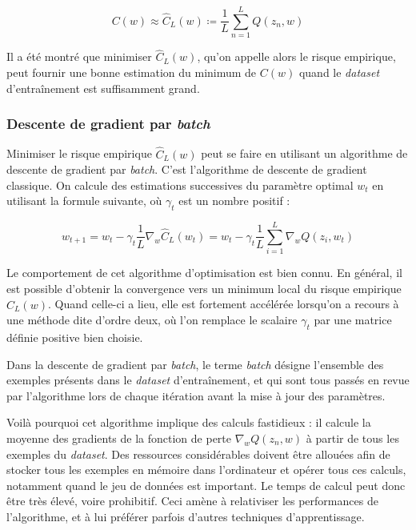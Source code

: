 \documentclass{article}
\begin{document}
\begin{equation*}
    C(w) \approx \hat{C}_L(w) \coloneqq \frac{1}{L} \sum_{n=1}^{L}Q(z_n, w)
\end{equation*}

Il a été montré que minimiser $\hat{C}_L(w)$, qu'on appelle alors le risque empirique, peut fournir une bonne estimation du minimum de $C(w)$ quand le \emph{dataset} d'entraînement est suffisamment grand.

\subsubsection{Descente de gradient par \emph{batch}}

Minimiser le risque empirique $\hat{C}_L(w)$ peut se faire en utilisant un algorithme de descente de gradient par \emph{batch}. C'est l'algorithme de descente de gradient classique. On calcule des estimations successives du paramètre optimal $w_t$ en utilisant la formule suivante, où $\gamma_t$ est un nombre positif :

\begin{equation*}
    w_{t+1} = w_t - \gamma_t \frac{1}{L} \nabla_w \hat{C}_L(w_t) = w_t - \gamma_t \frac{1}{L} \sum_{i=1}^{L} \nabla_w Q(z_i, w_t)
\end{equation*}

Le comportement de cet algorithme d'optimisation est bien connu. En général, il est possible d'obtenir la convergence vers un minimum local du risque empirique $\hat{C}_L(w)$. Quand celle-ci a lieu, elle est fortement accélérée lorsqu'on a recours à une méthode dite d'ordre deux, où l'on remplace le scalaire $\gamma_t$ par une matrice définie positive bien choisie.
\bigskip

Dans la descente de gradient par \emph{batch}, le terme \emph{batch} désigne l'ensemble des exemples présents dans le \emph{dataset} d'entraînement, et qui sont tous passés en revue par l'algorithme lors de chaque itération avant la mise à jour des paramètres. 

Voilà pourquoi cet algorithme implique des calculs fastidieux : il calcule la moyenne des gradients de la fonction de perte $\nabla_w Q(z_n, w)$ à partir de tous les exemples du \emph{dataset}. Des ressources considérables doivent être allouées afin de stocker tous les exemples en mémoire dans l'ordinateur et opérer tous ces calculs, notamment quand le jeu de données est important. Le temps de calcul peut donc être très élevé, voire prohibitif. Ceci amène à relativiser les performances de l'algorithme, et à lui préférer parfois d'autres techniques d'apprentissage.
\end{document}
